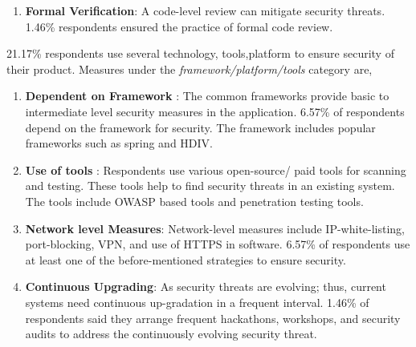 \begin{enumerate}[label=(\alph*)]
    \item \textbf{Formal Verification}: A code-level review can mitigate security threats. 1.46\% respondents ensured the practice of formal code review.
    
\end{enumerate}

21.17\% respondents use several technology, tools,platform to ensure security of their product. Measures under the \emph{framework/platform/tools} category are,
\begin{enumerate}[label=(\alph*)]

     \item \textbf{Dependent on Framework} : The common frameworks provide basic to intermediate level security measures in the application. 6.57\% of respondents depend on the framework for security. The framework includes popular frameworks such as spring and  HDIV.
    
    \item \textbf{Use of tools} : Respondents use various open-source/ paid tools for scanning and testing. These tools help to find security threats in an existing system. The tools include OWASP based tools and  penetration testing tools.
    
    \item \textbf{Network level Measures}: Network-level measures include IP-white-listing, port-blocking, VPN, and use of HTTPS  in software. 6.57\% of respondents use at least one of the before-mentioned strategies to ensure security.

    \item \textbf{Continuous Upgrading}: As security threats are evolving; thus, current systems need continuous up-gradation in a frequent interval. 1.46\% of respondents said they arrange frequent hackathons, workshops, and security audits to address the continuously evolving security threat.

\end{enumerate}

